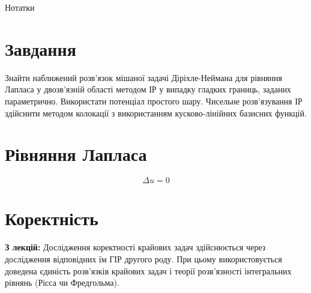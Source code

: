 \documentclass[12pt,a4paper]{article}
\newcounter{e}
\begin{document}
 \begin{LARGE}
 Нотатки
 \end{LARGE}
	
 \thispagestyle{empty}
 \section{Завдання}
 Знайти наближений розв'язок мішаної задачі Діріхле-Неймана для рівняння Лапласа у двозв'язній області методом ІР у випадку гладких границь, заданих параметрично. Використати потенціал простого шару. Чисельне розв'язування ІР здійснити методом колокації з використанням кусково-лінійних базисних функцій.
 
 \section{Рівняння Лапласа}
 $$
 \Delta u = 0
 $$
 
 \section{Коректність}
 \textbf{З лекцій:} Дослідження коректності крайових задач здійснюється через дослідження відповідних їм ГІР другого роду. При цьому використовується доведена єдиність розв'язків крайових задач і теорії розв'язності інтегральних рівнянь (Рісса чи Фредгольма).

 
\end{document}
